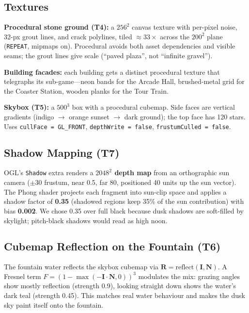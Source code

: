 \documentclass[10pt,a4paper]{article}
\begin{document}
\subsection{Textures}

\textbf{Procedural stone ground (T4):} a $256^2$ canvas texture with per-pixel noise,
32-px grout lines, and crack polylines, tiled $\approx 33\times$ across the $200^2$ plane
(\texttt{REPEAT}, mipmaps on). Procedural avoids both asset dependencies and visible seams;
the grout lines give scale (``paved plaza'', not ``infinite gravel'').

\textbf{Building facades:} each building gets a distinct procedural texture that telegraphs
its sub-game---neon bands for the Arcade Hall, brushed-metal grid for the Coaster Station,
wooden planks for the Tour Train.

\textbf{Skybox (T5):} a $500^3$ box with a procedural cubemap. Side faces are vertical
gradients (indigo $\to$ orange sunset $\to$ dark ground); the top face has 120 stars. Uses
\texttt{cullFace = GL\_FRONT}, \texttt{depthWrite = false}, \texttt{frustumCulled = false}.

\subsection{Shadow Mapping (T7)}

OGL's \texttt{Shadow} extra renders a \textbf{$2048^2$ depth map} from an orthographic sun
camera ($\pm30$ frustum, near 0.5, far 80, positioned 40 units up the sun vector). The Phong
shader projects each fragment into sun-clip space and applies a shadow factor of
\textbf{0.35} (shadowed regions keep 35\% of the sun contribution) with bias \textbf{0.002}.
We chose 0.35 over full black because dusk shadows are soft-filled by skylight; pitch-black
shadows would read as high noon.

\subsection{Cubemap Reflection on the Fountain (T6)}

The fountain water reflects the skybox cubemap via
$\mathbf{R} = \text{reflect}(\mathbf{I}, \mathbf{N})$. A Fresnel term
$F = (1 - \max(-\mathbf{I}\cdot\mathbf{N}, 0))^3$ modulates the mix: grazing angles show
mostly reflection (strength 0.9), looking straight down shows the water's dark teal
(strength 0.45). This matches real water behaviour and makes the dusk sky paint itself
onto the fountain.
\end{document}
